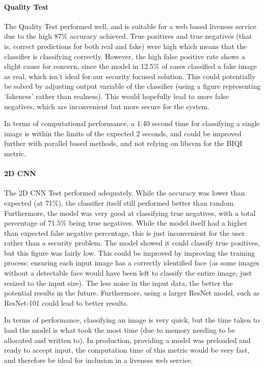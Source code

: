 \documentclass[11pt,a4paper]{article}
\begin{document}
        \paragraph{Quality Test}
            The Quality Test performed well, and is suitable for a web based liveness service due to the high 87\% accuracy achieved.
            True positives and true negatives (that is, correct predictions for both real and fake) were high which means that the classifier
            is classifying correctly. However, the high false positive rate shows a slight cause for concern, since the model in 12.5\% of cases
            classified a fake image as real, which isn't ideal for our security focused solution. This could potentially be solved by adjusting output
            variable of the classifier (using a figure representing 'fakeness' rather than realness). This would hopefully lead to more false negatives,
            which are inconvenient but more secure for the system.

            In terms of computational performance, a 1.40 second time for classifying a single image is within the limits of the expected 2 seconds, and could be improved further
            with parallel based methods, and not relying on libsvm for the BIQI metric.
        \paragraph{2D CNN}
            The 2D CNN Test performed adequately. While the accuracy was lower than expected (at 71\%), the classifier itself still performed better than random.
            Furthermore, the model was very good at classifying true negatives, with a total percentage of 71.5\% being true negatives. While the model itself had
            a higher than expected false negative percentage, this is just inconvenient for the user rather than a security problem. The model showed it could classify true
            positives, but this figure was fairly low. This could be improved by improving the training process: ensuring each input image has a correctly identified face (as
            some images without a detectable face would have been left to classify the entire image, just resized to the input size). The less noise in the input data, the better the potential
            results in the future. Furthermore, using a larger ResNet model, such as ResNet-101 could lead to better results.

            In terms of performance, classifying an image is very quick, but the time taken to load the model is what took the most time (due to memory needing to be allocated and written to).
            In production, providing a model was preloaded and ready to accept input, the computation time of this metric would be very fast, and therefore be ideal for inclusion in a liveness web service.
\end{document}

